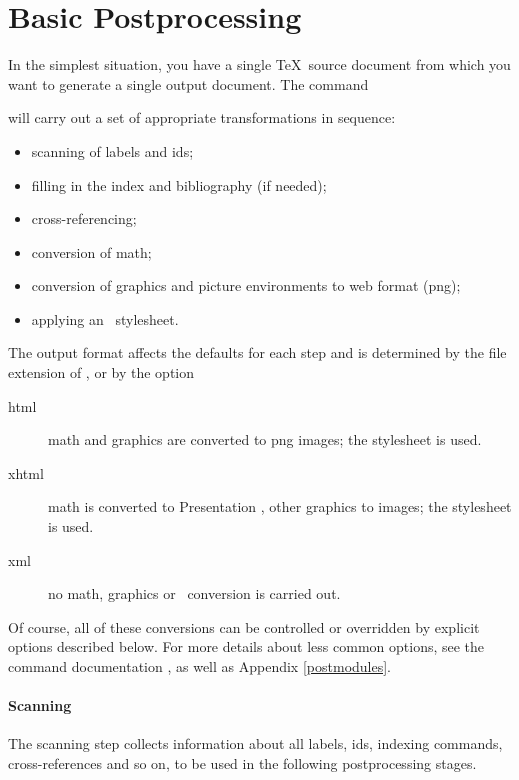 \documentclass{report}
\begin{document}
\section{Basic Postprocessing}\label{usage.single}
In the simplest situation, you have a single \TeX\ source document
from which you want to generate a single output document.
The command
\begin{quote}
\end{quote}
will carry out a set of appropriate transformations in sequence:
\begin{itemize}
  \item scanning of labels and ids;
  \item filling in the index and bibliography (if needed);
  \item cross-referencing;
  \item conversion of math;
  \item conversion of graphics and picture environments to web format (png);
  \item applying an \XSLT\ stylesheet.
\end{itemize}
The output format affects the defaults for each step and is determined
by the file extension of , or by the option
\begin{quote}
\end{quote}
\begin{description}
 \item[html] math and graphics are converted to png images;
    the  stylesheet is used.
 \item[xhtml] math is converted to Presentation \MathML, other graphics to images;
    the  stylesheet is used.
 \item[xml] no math, graphics or \XSLT\ conversion is carried out.
\end{description}
Of course, all of these conversions can be controlled or overridden
by explicit options described below.
For more details about less common options, see the command
documentation , as well as Appendix \ref{postmodules}.

\paragraph{Scanning}
The scanning step collects information about all labels, ids,
indexing commands, cross-references and so on, to be used
in the following postprocessing stages.
\end{document}

